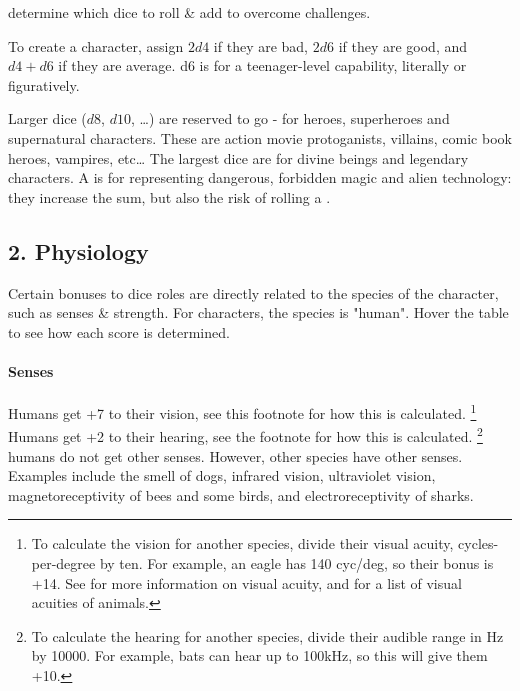 \documentclass{LegrandOrangeTufteBook}
\begin{document}
 determine which dice to roll \& add
to overcome challenges.

To create a  character,
\marginpar{
	\footnotesize
	
}
assign $2d4$ if they are bad,
$2d6$ if they are good, and $d4 + d6$ if they are average.
d6 is for a teenager-level capability, literally or figuratively.

Larger dice ($d8$, $d10$, \ldots) are reserved to go  - for heroes, superheroes and supernatural characters.
These are action movie protoganists, villains, comic book heroes, vampires, etc\dots
The largest dice are for divine beings and legendary characters.
A  is for representing dangerous, forbidden magic and alien technology:
they increase the sum, but also the risk of rolling a .


\subsection*{2. Physiology}
Certain bonuses to dice roles are directly related to the species of the character, such as senses \& strength.
For  characters, the species is "human".
Hover the table to see how each score is determined.

\begin{figure}[H]
	\centering

\end{figure}


\paragraph*{Senses}
Humans get +7 to their vision, see this footnote for how this is calculated.
\footnote{
	To calculate the vision for another species, divide their visual acuity, cycles-per-degree by ten.
	For example, an eagle has 140 cyc/deg, so their bonus is +14.
	See \cite{caves_acuityview_2018} for more information on visual acuity,
	and \cite{noauthor_list_2019} for a list of visual acuities of animals.
}
Humans get +2 to their hearing, see the footnote for how this is calculated.
\footnote{
	To calculate the hearing for another species, divide their audible range in Hz by 10000.
	For example, bats can hear up to 100kHz, so this will give them +10.
}
 humans do not get other senses.
However, other species have other senses.
Examples include the smell of dogs, infrared vision, ultraviolet vision,
magnetoreceptivity of bees and some birds, and electroreceptivity of sharks.
\end{document}
